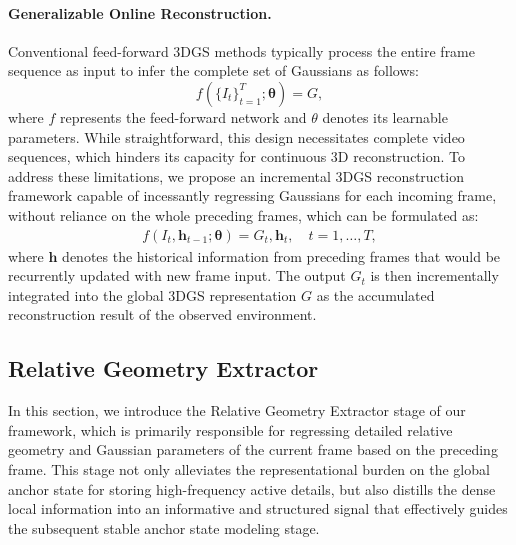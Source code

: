 \paragraph{Generalizable Online Reconstruction.}
Conventional feed-forward 3DGS methods typically process the entire frame sequence as input to infer the complete set of Gaussians as follows:
\begin{equation}
    f(\{I_t\}_{t=1}^{T};\mathbf{\theta}) = G,
\end{equation}where $f$ represents the feed-forward network and $\theta$ denotes its learnable parameters. While straightforward, this design necessitates complete video sequences, which hinders its capacity for continuous 3D reconstruction. To address these limitations, we propose an incremental 3DGS reconstruction framework capable of incessantly regressing Gaussians for each incoming frame, without reliance on the whole preceding frames, which can be formulated as:
\begin{align}
    f(I_t, \mathbf{h}_{t-1}; \mathbf{\theta}) =  G_t, \mathbf{h}_t, \quad t = 1, \dots, T,
\end{align}where $\mathbf{h}$ denotes the historical information from preceding frames that would be recurrently updated with new frame input. The output $G_t$ is then incrementally integrated into the global 3DGS representation $G$ as the accumulated reconstruction result of the observed environment.


\subsection{Relative Geometry Extractor}



\label{sec:relative_aggregation}
In this section, we introduce the Relative Geometry Extractor stage of our framework, which is primarily responsible for regressing detailed relative geometry and Gaussian parameters of the current frame based on the preceding frame. This stage not only alleviates the representational burden on the global anchor state for storing high-frequency active details, but also distills the dense local information into an informative and structured signal that effectively guides the subsequent stable anchor state modeling stage.



